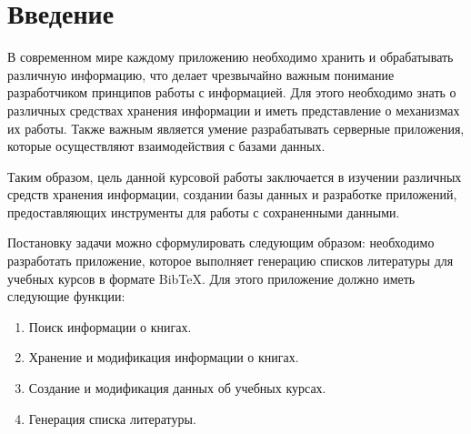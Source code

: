\section*{Введение}

В современном мире каждому приложению необходимо хранить и обрабатывать
различную информацию, что делает чрезвычайно важным понимание разработчиком принципов работы с информацией. Для этого
необходимо знать о различных средствах хранения информации и иметь представление о механизмах их работы. Также важным является
умение разрабатывать серверные приложения, которые осуществляют взаимодействия с базами данных.

Таким образом, цель данной курсовой работы заключается в изучении различных средств хранения информации, создании базы
данных и разработке приложений, предоставляющих инструменты для работы с сохраненными данными.

Постановку задачи можно сформулировать следующим образом:
необходимо разработать приложение, которое выполняет генерацию списков литературы
для учебных курсов в формате BibTeX. Для этого приложение должно иметь следующие функции:

\begin{enumerate}
    \item Поиск информации о книгах.
    \item Хранение и модификация информации о книгах.
    \item Создание и модификация данных об учебных курсах.
    \item Генерация списка литературы.
\end{enumerate}